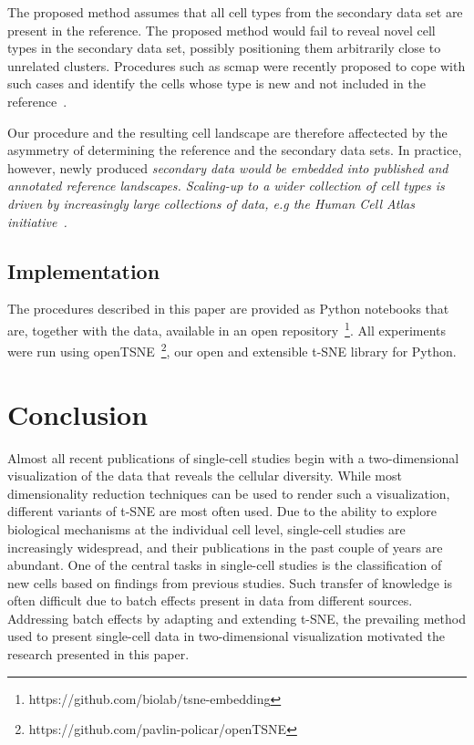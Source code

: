 \documentclass[runningheads]{llncs}
\begin{document}
The proposed method assumes that all cell types from the secondary data set are
present in the reference. The proposed method would fail to reveal novel cell
types in the secondary data set, possibly positioning them arbitrarily close to
unrelated clusters. Procedures such as scmap were recently proposed to cope
with such cases and identify the cells whose type is new and not included in
the reference~\cite{scmap}.

Our procedure and the resulting cell landscape are therefore affectected by the
asymmetry of determining the reference and the secondary data sets. In
practice, however, newly produced \em secondary \em data would be embedded into
published and annotated reference landscapes. Scaling-up to a wider collection
of cell types is driven by increasingly large collections of data, e.g the
Human Cell Atlas initiative~\cite{hca}.


\subsection{Implementation\label{sec:implementation}}

The procedures described in this paper are provided as Python notebooks that
are, together with the data, available in an open
repository~\footnote{https://github.com/biolab/tsne-embedding}. All experiments
were run using openTSNE~\footnote{https://github.com/pavlin-policar/openTSNE},
our open and extensible t-SNE library for Python.

\section{Conclusion}

Almost all recent publications of single-cell studies begin with a
two-dimensional visualization of the data that reveals the cellular diversity.
While most dimensionality reduction techniques can be used to render such a
visualization, different variants of t-SNE are most often used. Due to the
ability to explore biological mechanisms at the individual cell level,
single-cell studies are increasingly widespread, and their publications in the
past couple of years are abundant. One of the central tasks in single-cell
studies is the classification of new cells based on findings from previous
studies. Such transfer of knowledge is often difficult due to batch effects
present in data from different sources.  Addressing batch effects by adapting
and extending t-SNE, the prevailing method used to present single-cell data in
two-dimensional visualization motivated the research presented in this paper.
\end{document}
